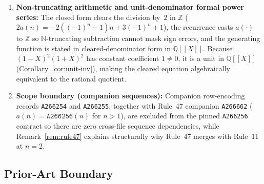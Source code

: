 \documentclass[11pt]{article}
\newcommand{\llbracket}{[\![}
\newcommand{\rrbracket}{]\!]}
\theoremstyle{definition}
\newcommand{\N}{\mathbb{N}}
\newcommand{\Z}{\mathbb{Z}}
\newcommand{\Q}{\mathbb{Q}}
\newcommand{\seq}[1]{\texttt{#1}}
\begin{document}
\begin{enumerate}
\item \textbf{Non-truncating arithmetic and unit-denominator formal power series:} The closed form clears the division by~$2$ in $\Z$ ($2 a(n) = -2((-1)^n - 1)n + 3(-1)^n + 1$), the recurrence casts $a(\cdot)$ to $\Z$ so $\N$-truncating subtraction cannot mask sign errors, and the generating function is stated in cleared-denominator form in $\Q\llbracket X \rrbracket$. Because $(1 - X)^2(1 + X)^2$ has constant coefficient $1 \ne 0$, it is a unit in $\Q\llbracket X \rrbracket$ (Corollary~\ref{cor:unit-inv}), making the cleared equation algebraically equivalent to the rational quotient.
\item \textbf{Scope boundary (companion sequences):} Companion row-encoding records \seq{A266254} and \seq{A266255}, together with Rule~47 companion \seq{A266662} ($a(n) = \seq{A266256}(n)$ for $n > 1$), are excluded from the pinned \seq{A266256} contract so there are zero cross-file sequence dependencies, while Remark~\ref{rem:rule47} explains structurally why Rule~47 merges with Rule~11 at $n = 2$.
\end{enumerate}

\subsection{Prior-Art Boundary}
\label{sec:prior-art}
\end{document}
